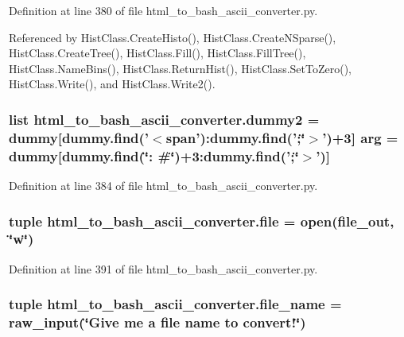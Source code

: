 Definition at line 380 of file html\-\_\-to\-\_\-bash\-\_\-ascii\-\_\-converter.\-py.



Referenced by Hist\-Class.\-Create\-Histo(), Hist\-Class.\-Create\-N\-Sparse(), Hist\-Class.\-Create\-Tree(), Hist\-Class.\-Fill(), Hist\-Class.\-Fill\-Tree(), Hist\-Class.\-Name\-Bins(), Hist\-Class.\-Return\-Hist(), Hist\-Class.\-Set\-To\-Zero(), Hist\-Class.\-Write(), and Hist\-Class.\-Write2().

\subsubsection[{dummy2}]{\setlength{\rightskip}{0pt plus 5cm}list html\-\_\-to\-\_\-bash\-\_\-ascii\-\_\-converter.\-dummy2 = {\bf dummy}\mbox{[}dummy.\-find('$<$span')\-:dummy.\-find(';\char`\"{}$>$')+3\mbox{]} arg = {\bf dummy}\mbox{[}dummy.\-find(\char`\"{}\-: \#\char`\"{})+3\-:dummy.\-find(';\char`\"{}$>$')\mbox{]}}\label{namespacehtml__to__bash__ascii__converter_a99067e6cbccc1d304054ce4795e7a002}


Definition at line 384 of file html\-\_\-to\-\_\-bash\-\_\-ascii\-\_\-converter.\-py.

\subsubsection[{file}]{\setlength{\rightskip}{0pt plus 5cm}tuple html\-\_\-to\-\_\-bash\-\_\-ascii\-\_\-converter.\-file = open({\bf file\-\_\-out}, \char`\"{}w\char`\"{})}\label{namespacehtml__to__bash__ascii__converter_a581541bd272af45521cffc96b1460d6a}


Definition at line 391 of file html\-\_\-to\-\_\-bash\-\_\-ascii\-\_\-converter.\-py.

\subsubsection[{file\-\_\-name}]{\setlength{\rightskip}{0pt plus 5cm}tuple html\-\_\-to\-\_\-bash\-\_\-ascii\-\_\-converter.\-file\-\_\-name = raw\-\_\-input(\char`\"{}Give me a {\bf file} name to convert!\char`\"{})}\label{namespacehtml__to__bash__ascii__converter_acbc9db9cfd7871bf001658ddbadf55d5}


